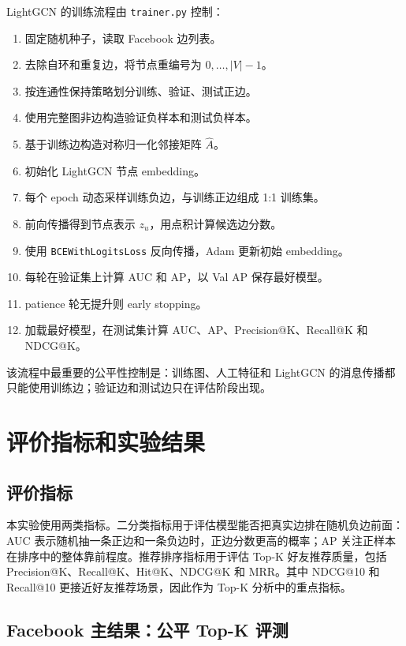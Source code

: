 \documentclass[UTF8,zihao=-4]{ctexart}
\begin{document}
LightGCN 的训练流程由 \texttt{trainer.py} 控制：

\begin{enumerate}
  \item 固定随机种子，读取 Facebook 边列表。
  \item 去除自环和重复边，将节点重编号为 \(0,\dots,|V|-1\)。
  \item 按连通性保持策略划分训练、验证、测试正边。
  \item 使用完整图非边构造验证负样本和测试负样本。
  \item 基于训练边构造对称归一化邻接矩阵 \(\hat A\)。
  \item 初始化 LightGCN 节点 embedding。
  \item 每个 epoch 动态采样训练负边，与训练正边组成 1:1 训练集。
  \item 前向传播得到节点表示 \(z_u\)，用点积计算候选边分数。
  \item 使用 \texttt{BCEWithLogitsLoss} 反向传播，Adam 更新初始 embedding。
  \item 每轮在验证集上计算 AUC 和 AP，以 Val AP 保存最好模型。
  \item patience 轮无提升则 early stopping。
  \item 加载最好模型，在测试集计算 AUC、AP、Precision@K、Recall@K 和 NDCG@K。
\end{enumerate}

该流程中最重要的公平性控制是：训练图、人工特征和 LightGCN 的消息传播都只能使用训练边；验证边和测试边只在评估阶段出现。

\section{评价指标和实验结果}

\subsection{评价指标}

本实验使用两类指标。二分类指标用于评估模型能否把真实边排在随机负边前面：AUC 表示随机抽一条正边和一条负边时，正边分数更高的概率；AP 关注正样本在排序中的整体靠前程度。推荐排序指标用于评估 Top-K 好友推荐质量，包括 Precision@K、Recall@K、Hit@K、NDCG@K 和 MRR。其中 NDCG@10 和 Recall@10 更接近好友推荐场景，因此作为 Top-K 分析中的重点指标。

\subsection{Facebook 主结果：公平 Top-K 评测}
\end{document}
